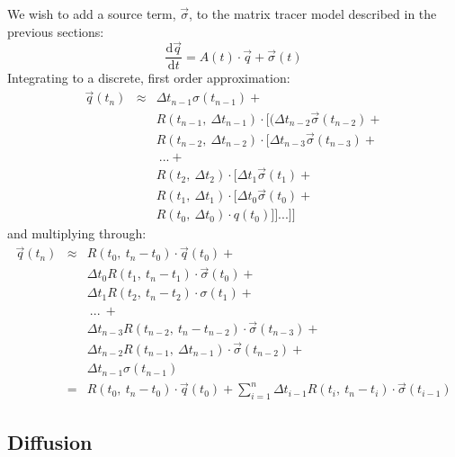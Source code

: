 \documentclass[11pt]{article}
\begin{document}
We wish to add a source term, $\vec \sigma$, to the matrix tracer model
described in the previous sections:
\begin{equation}
\frac{\mathrm d \vec q}{\mathrm d t} = A(t) \cdot \vec q + \vec \sigma(t)
\end{equation}
Integrating to a discrete, first order approximation:
\begin{eqnarray}
  \vec q(t_n) 
  & \approx & \Delta t_{n-1} \sigma(t_{n-1}) + \nonumber \\
  & & R(t_{n-1}, ~ \Delta t_{n-1}) \cdot [(\Delta t_{n-2} \vec \sigma(t_{n-2}) + \nonumber \\
  & & R(t_{n-2}, ~ \Delta t_{n-2}) \cdot [\Delta t_{n-3} \vec \sigma(t_{n-3}) + \nonumber \\
  & & ~... + \nonumber \\
  & & R(t_2, ~ \Delta t_2) \cdot [\Delta t_1 \vec \sigma(t_1) + \nonumber \\
  & & R(t_1, ~ \Delta t_1) \cdot [\Delta t_0 \vec \sigma(t_0) + \nonumber \\
  & & R(t_0, ~ \Delta t_0) \cdot q(t_0) ]]...]]
\end{eqnarray}
and multiplying through:
\begin{eqnarray}
\vec q(t_n) 
  & \approx & R(t_0, ~ t_n-t_0) \cdot \vec q(t_0) + \nonumber \\
  & & \Delta t_0 R(t_1, ~ t_n-t_1) \cdot \vec \sigma(t_0) + \nonumber \\
  & & \Delta t_1 R(t_2, ~ t_n-t_2) \cdot \sigma(t_1) + \nonumber \\
  & & ~...~+ \nonumber \\ 
  & & \Delta t_{n-3} R(t_{n-2}, ~ t_n-t_{n-2}) \cdot \vec\sigma(t_{n-3}) + \nonumber \\
  & & \Delta t_{n-2} R(t_{n-1}, ~ \Delta t_{n-1}) \cdot \vec \sigma(t_{n-2}) + \nonumber \\
  & & \Delta t_{n-1} \sigma(t_{n-1}) \\
  & = & R(t_0,~t_n-t_0) \cdot \vec q(t_0) + 
  \sum_{i=1}^{n} \Delta t_{i-1} R(t_i,~t_n-t_i) \cdot \vec \sigma(t_{i-1})
\end{eqnarray}

\subsection{Diffusion}
\end{document}
